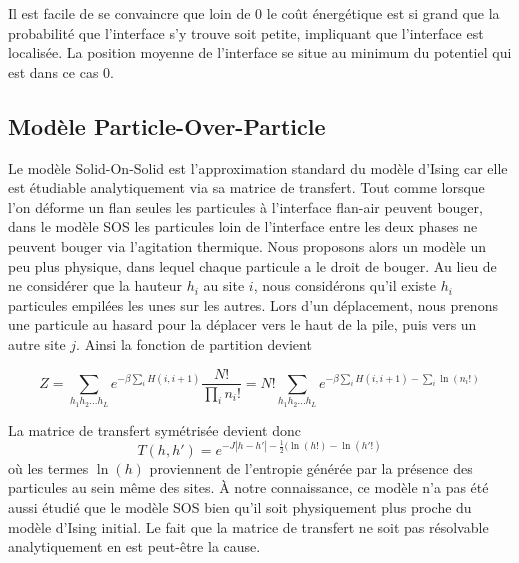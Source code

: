 Il est facile de se convaincre que loin de $0$ le coût énergétique est si grand que la probabilité que l'interface s'y trouve soit petite, impliquant que l'interface est localisée. La position moyenne de l'interface se situe au minimum du potentiel qui est dans ce cas $0$. 

	\subsection{Modèle Particle-Over-Particle }
	
	Le modèle Solid-On-Solid est l'approximation standard du modèle d'Ising car elle est étudiable analytiquement via sa matrice de transfert. 	Tout comme lorsque l'on déforme un flan seules les particules à l'interface flan-air peuvent bouger, dans le modèle SOS les particules loin de l'interface entre les deux phases ne peuvent bouger via l'agitation thermique. 
	Nous proposons alors un modèle un peu plus physique, dans lequel chaque particule a le droit de bouger. Au lieu de ne considérer que la hauteur $h_i$ au site $i$, nous considérons qu'il existe $h_i$ particules empilées les unes sur les autres. Lors d'un déplacement, nous prenons une particule au hasard pour la déplacer vers le haut de la pile, puis vers un autre site $j$. 
	Ainsi la fonction de partition devient
	
\begin{equation}
	Z = \sum_{h_1 h_2 ... h_L} e^{- \beta \sum_{i} H(i,i+1)} \frac{N!}{\prod_i n_i!} = N! \sum_{h_1 h_2 ... h_L} e^{- \beta \sum_{i} H(i,i+1) -\sum_i \ln(n_i!)}
\end{equation}

La matrice de transfert symétrisée devient donc
\begin{equation}
	T(h,h') = e^{-J |h-h'| - \frac{1}{2}(\ln(h!)-\ln(h'!)}
\end{equation}
où les termes $\ln(h)$ proviennent de l'entropie générée par la présence des particules au sein même des sites. À notre connaissance, ce modèle n'a pas été aussi étudié que le modèle SOS bien qu'il soit physiquement plus proche du modèle d'Ising initial. Le fait que la matrice de transfert ne soit pas résolvable analytiquement en est peut-être la cause. 



























